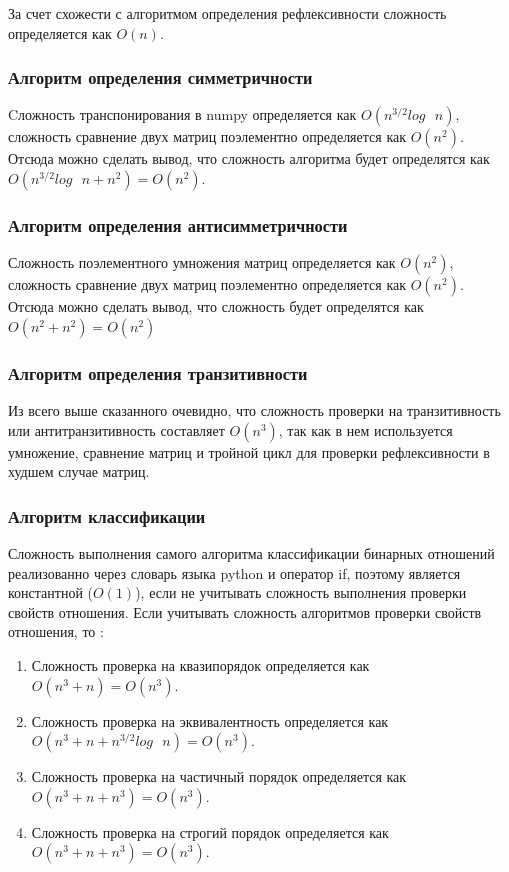 \documentclass[spec, och, labwork]{shiza}
\begin{document}
            За счет схожести с алгоритмом определения рефлексивности сложность определяется как $O(n)$.

        \subsubsection{Алгоритм определения симметричности}

            Cложность транспонирования в numpy определяется как $O(n^{3/2}log \text{ } n)$, сложность сравнение двух матриц поэлементно определяется как $O(n^2)$. 
            Отсюда можно сделать вывод, что сложность алгоритма будет определятся как 
            $O(n^{3/2}log \text{ } n + n^2) = O(n^2)$.

        \subsubsection{Алгоритм определения антисимметричности}

            Сложность поэлементного умножения матриц определяется как $O(n^2)$, сложность сравнение двух матриц поэлементно определяется как $O(n^2)$.
            Отсюда можно сделать вывод, что сложность будет определятся как $O(n^2 + n^2) = O(n^2)$

        \subsubsection{Алгоритм определения транзитивности}

            Из всего выше сказанного очевидно, что сложность проверки на транзитивность или антитранзитивность составляет $O(n^3)$,
            так как в нем используется умножение, сравнение матриц и тройной цикл для проверки рефлексивности в худшем случае матриц.

        \subsubsection{Алгоритм классификации}
            Сложность выполнения самого алгоритма классификации бинарных отношений реализованно через словарь языка python
            и оператор if, поэтому является константной ($O(1)$), если не учитывать сложность выполнения проверки свойств отношения.
            Если учитывать сложность алгоритмов проверки свойств отношения, то :

            \begin{enumerate}
                \item Сложность проверка на квазипорядок определяется как $O(n^3 + n) = O(n^3)$.
                \item Сложность проверка на эквивалентность определяется как $O(n^3 + n + n^{3/2}log \text{ } n) = O(n^3)$.
                \item Сложность проверка на частичный порядок определяется как $O(n^3 + n + n^3) = O(n^3)$.
                \item Сложность проверка на строгий порядок определяется как $O(n^3 + n + n^3) = O(n^3)$.
            \end{enumerate}
\end{document}
